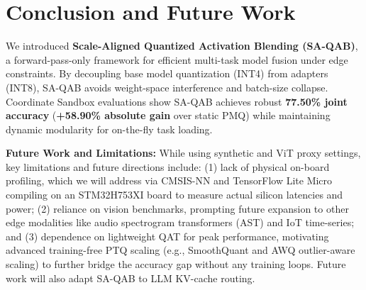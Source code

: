 \section{Conclusion and Future Work}
\label{sec:conclusion}

We introduced \textbf{Scale-Aligned Quantized Activation Blending (SA-QAB)}, a forward-pass-only framework for efficient multi-task model fusion under edge constraints. By decoupling base model quantization (INT4) from adapters (INT8), SA-QAB avoids weight-space interference and batch-size collapse. Coordinate Sandbox evaluations show SA-QAB achieves robust \textbf{77.50\% joint accuracy} (\textbf{+58.90\% absolute gain} over static PMQ) while maintaining dynamic modularity for on-the-fly task loading.

\textbf{Future Work and Limitations:} While using synthetic and ViT proxy settings, key limitations and future directions include: (1) lack of physical on-board profiling, which we will address via CMSIS-NN and TensorFlow Lite Micro compiling on an STM32H753XI board to measure actual silicon latencies and power; (2) reliance on vision benchmarks, prompting future expansion to other edge modalities like audio spectrogram transformers (AST) and IoT time-series; and (3) dependence on lightweight QAT for peak performance, motivating advanced training-free PTQ scaling (e.g., SmoothQuant and AWQ outlier-aware scaling) to further bridge the accuracy gap without any training loops. Future work will also adapt SA-QAB to LLM KV-cache routing.